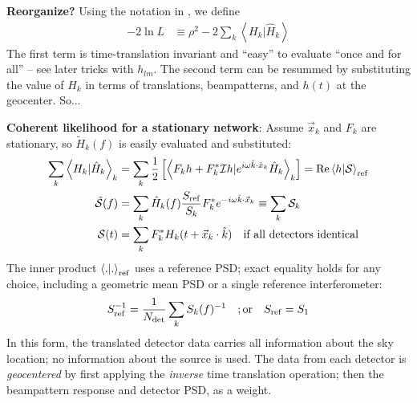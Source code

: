 \documentclass[twocolumn,prd,nofootinbib]{revtex4}
\newcommand\editremark[1]{{\color{red} #1}}
\newcommand\qmstateproduct[2]{\left\langle#1|#2\right\rangle}
\begin{document}
\begin{widetext}
\begin{shaded}
\noindent \textbf{Reorganize?}
Using the notation in  \citet{gwastro-mergers-HeeSuk-CompareToPE-Aligned}, we define 
\begin{eqnarray}
-2 \ln L &\equiv \rho^2 - 2 \sum_k \qmstateproduct{H_k}{\hat{H}_k}
\end{eqnarray}
The first term is time-translation invariant and ``easy'' to evaluate ``once and for all'' -- see later tricks with
$h_{lm}$.   The second term can be resummed by substituting the value of $H_k$ in terms of translations, beampatterns,
and $h(t)$ at the geocenter.  So...


\noindent \textbf{Coherent likelihood for a stationary network}: Assume $\vec{x}_k$ and $F_k$ are  stationary, so
$\tilde{H}_k(f)$ is easily evaluated and substituted: 
\begin{align}
\label{eq:def:GeocenteredInnerProductWithData}
\sum_k \qmstateproduct{H_k}{\hat{H}_k}_k 
& = 
 \sum_k \frac{1}{2}\left [ \qmstateproduct{ F_k h +  F_k^*{\cal I}h}{e^{i\omega \hat{k}\cdot \hat{x}_k} \hat{H}_k}_k
 \right]
= \text{Re} \qmstateproduct{h}{{\cal S}}_{\rm ref} \\
\tilde{{\cal S}}(f) &= \sum_k \hat{H}_k(f) \frac{S_{\rm ref}}{S_{k}} F_k^* e^{-i\omega \hat{k}\cdot \vec{x}_k} \equiv \sum_k {\cal S}_k\\
{\cal S}(t) &= \sum_k F_k^* H_k(t+\vec{x}_k\cdot \hat{k}) \quad \text{if all detectors identical}
\end{align}
The inner product $\qmstateproduct{.}{.}_{\rm ref}$ uses a reference PSD; exact equality holds for any choice, including
a geometric mean PSD or a single reference interferometer:
\begin{eqnarray}
S_{\rm ref}^{-1} = \frac{1}{N_{\rm det}} \sum_k S_{k}(f)^{-1} \quad ;\text{or} \quad  S_{\rm ref} = S_1
\end{eqnarray}
%
In this form, the translated detector data carries all information about the sky location; no information about the
source is used.  The data from each detector is \emph{geocentered} by first applying the \emph{inverse} time
translation operation; then the beampattern response and detector PSD, as a weight.
%


\end{shaded}
\end{widetext}
\end{document}
